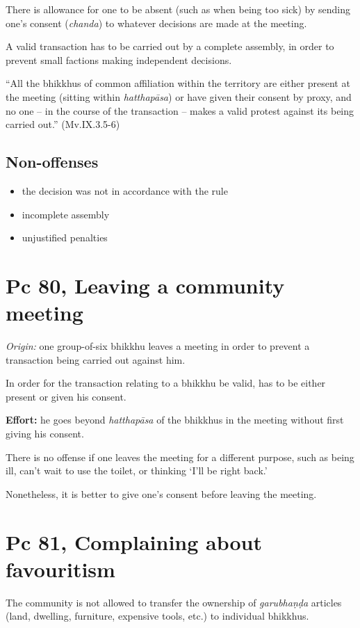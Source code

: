 There is allowance for one to be absent (such as when being too sick) by
sending one's consent (\emph{chanda}) to whatever decisions are made at
the meeting.

A valid transaction has to be carried out by a complete assembly, in
order to prevent small factions making independent decisions.

``All the bhikkhus of common affiliation within the territory are either
present at the meeting (sitting within \emph{hatthapāsa}) or have given
their consent by proxy, and no one -- in the course of the transaction
-- makes a valid protest against its being carried out.'' (Mv.IX.3.5-6)

\subsection{Non-offenses}

\begin{itemize}
\tightlist
\item
  the decision was not in accordance with the rule
\item
  incomplete assembly
\item
  unjustified penalties
\end{itemize}

\section{Pc 80, Leaving a community meeting}

\emph{Origin:} one group-of-six bhikkhu leaves a meeting in order to
prevent a transaction being carried out against him.

In order for the transaction relating to a bhikkhu be valid, has to be
either present or given his consent.

\textbf{Effort:} he goes beyond \emph{hatthapāsa} of the bhikkhus in the
meeting without first giving his consent.

There is no offense if one leaves the meeting for a different purpose,
such as being ill, can't wait to use the toilet, or thinking `I'll be
right back.'

Nonetheless, it is better to give one's consent before leaving the
meeting.

\section{Pc 81, Complaining about favouritism}

The community is not allowed to transfer the ownership of
\emph{garubhaṇḍa} articles (land, dwelling, furniture, expensive tools,
etc.) to individual bhikkhus.

